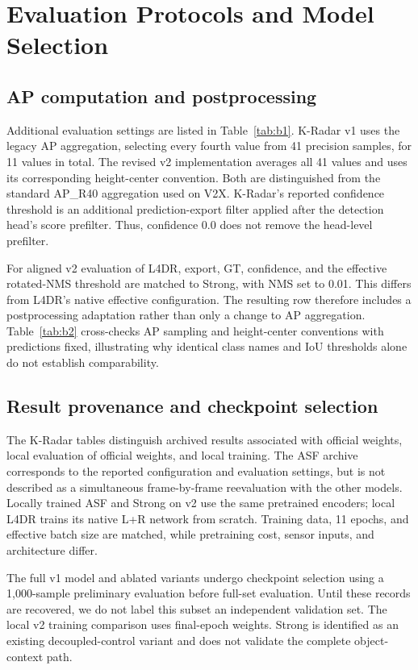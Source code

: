\section{Evaluation Protocols and Model Selection}
\label{app:b}

\subsection{AP computation and postprocessing}
\label{subsec:b1}

Additional evaluation settings are listed in Table~\ref{tab:b1}. K-Radar v1 uses the legacy AP aggregation, selecting every fourth value from 41 precision samples, for 11 values in total. The revised v2 implementation averages all 41 values and uses its corresponding height-center convention. Both are distinguished from the standard AP\_R40 aggregation used on V2X. K-Radar's reported confidence threshold is an additional prediction-export filter applied after the detection head's score prefilter. Thus, confidence 0.0 does not remove the head-level prefilter.

For aligned v2 evaluation of L4DR, export, GT, confidence, and the effective rotated-NMS threshold are matched to Strong, with NMS set to 0.01. This differs from L4DR's native effective configuration. The resulting row therefore includes a postprocessing adaptation rather than only a change to AP aggregation. Table~\ref{tab:b2} cross-checks AP sampling and height-center conventions with predictions fixed, illustrating why identical class names and IoU thresholds alone do not establish comparability.

\subsection{Result provenance and checkpoint selection}
\label{subsec:b2}

The K-Radar tables distinguish archived results associated with official weights, local evaluation of official weights, and local training. The ASF archive corresponds to the reported configuration and evaluation settings, but is not described as a simultaneous frame-by-frame reevaluation with the other models. Locally trained ASF and Strong on v2 use the same pretrained encoders; local L4DR trains its native L+R network from scratch. Training data, 11 epochs, and effective batch size are matched, while pretraining cost, sensor inputs, and architecture differ.

The full v1 model and ablated variants undergo checkpoint selection using a 1,000-sample preliminary evaluation before full-set evaluation.  Until these records are recovered, we do not label this subset an independent validation set. The local v2 training comparison uses final-epoch weights. Strong is identified as an existing decoupled-control variant and does not validate the complete object-context path.

